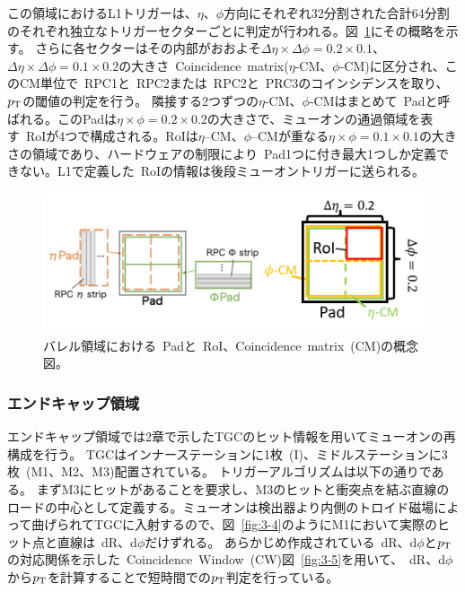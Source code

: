 この領域におけるL1トリガーは、$\eta$、$\phi$方向にそれぞれ32分割された合計64分割のそれぞれ独立なトリガーセクターごとに判定が行われる。図~\ref{fig:3-3}にその概略を示す。
さらに各セクターはその内部がおおよそ$\Delta\eta\times\Delta\phi=0.2\times0.1$、$\Delta\eta\times\Delta\phi=0.1\times0.2$の大きさ~Coincidence~matrix($\eta$-CM、$\phi$-CM)に区分され、このCM単位で~RPC1と~RPC2または~RPC2と~PRC3のコインシデンスを取り、$p_\mathrm{T}$の閾値の判定を行う。
隣接する2つずつの$\eta$-CM、$\phi$-CMはまとめて~Padと呼ばれる。このPadは$\eta\times\phi=0.2\times0.2$の大きさで、ミューオンの通過領域を表す~RoIが4つで構成される。RoIは$\eta$--CM、$\phi$--CMが重なる$\eta\times\phi=0.1\times0.1$の大きさの領域であり、ハードウェアの制限により~Pad1つに付き最大1つしか定義できない。L1で定義した~RoIの情報は後段ミューオントリガーに送られる。

\begin{figure}[h]
  \centering
  \includegraphics[clip, width=13cm]{fig/3/L1_RoI_CM.png}
  \caption{バレル領域における~Padと~RoI、Coincidence~matrix~(CM)の概念図。}
  \label{fig:3-3}
\end{figure}

\subsubsection{エンドキャップ領域}
エンドキャップ領域では2章で示したTGCのヒット情報を用いてミューオンの再構成を行う。
TGCはインナーステーションに1枚~(I)、ミドルステーションに3枚~(M1、M2、M3)配置されている。
トリガーアルゴリズムは以下の通りである。
まずM3にヒットがあることを要求し、M3のヒットと衝突点を結ぶ直線のロードの中心として定義する。ミューオンは検出器より内側のトロイド磁場によって曲げられてTGCに入射するので、図~\ref{fig:3-4}のようにM1において実際のヒット点と直線は~dR、d$\phi$だけずれる。
あらかじめ作成されている~dR、d$\phi$と$p_\mathrm{T}$の対応関係を示した~Coincidence~Window~(CW)図~\ref{fig:3-5}を用いて、~dR、d$\phi$から$p_\mathrm{T}$を計算することで短時間での$p_\mathrm{T}$判定を行っている。

